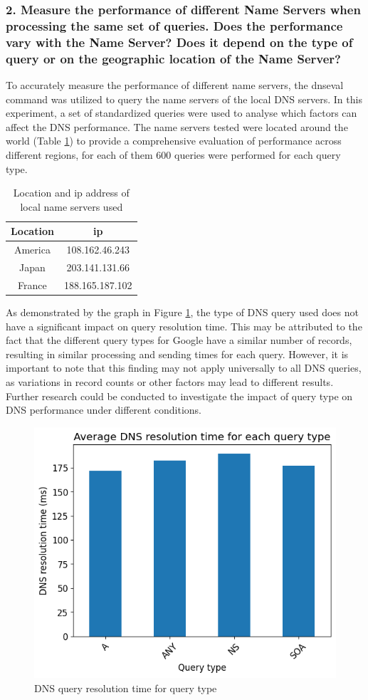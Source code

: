 \documentclass[eng]{class}
\begin{document}
\subsubsection*{2. Measure the performance of different Name Servers when processing the same
    set of queries. Does the performance vary with the Name Server? Does it depend
    on the type of query or on the geographic location of the Name Server?}
To accurately measure the performance of different name servers, the dnseval command was utilized to query the name servers of the local DNS servers.
In this experiment, a set of standardized queries were used to analyse which factors can affect the DNS performance.
The name servers tested were located around the world (Table \ref*{tab-7}) to provide a comprehensive evaluation of performance across different regions,
for each of them 600 queries were performed for each query type.
\begin{table}[H]
    \centering
    \begin{tabular}{|c|c|}
        \hline
        \linewidth=0cm
        Location & ip              \\
        \hline
        America  & 108.162.46.243  \\
        Japan    & 203.141.131.66  \\
        France   & 188.165.187.102 \\
        \hline
    \end{tabular}
    \caption{Location and ip address of local name servers used}
    \label{tab-7}
\end{table}

As demonstrated by the graph in Figure \ref{fig-6}, the type of DNS query used does not have a significant impact on query resolution time.
This may be attributed to the fact that the different query types for Google have a similar number of records,
resulting in similar processing and sending times for each query.
However, it is important to note that this finding may not apply universally to all DNS queries, as variations in record counts or other factors may lead to different results.
Further research could be conducted to investigate the impact of query type on DNS performance under different conditions.

\begin{figure}[H]
    \centering
    \includegraphics[width=.7\columnwidth]{images/latQueryType.png}
    \caption{DNS query resolution time for query type}
    \label{fig-6}
\end{figure}
\end{document}
